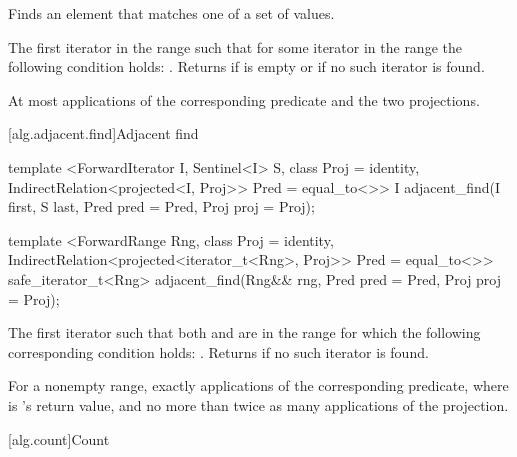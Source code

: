 \begin{itemdescr}
\pnum
\effects
Finds an element that matches one of a set of values.

\pnum
\returns
The first iterator
in the range 
such that for some
iterator
in the range 
the following condition holds:
.
Returns 
if  is empty or if
no such iterator is found.

\pnum
\complexity
At most
applications of the corresponding predicate and the two projections.
\end{itemdescr}

[alg.adjacent.find]{Adjacent find}

%
\begin{itemdecl}
template <ForwardIterator I, Sentinel<I> S, class Proj = identity,
    IndirectRelation<projected<I, Proj>> Pred = equal_to<>>
  I
    adjacent_find(I first, S last, Pred pred = Pred{},
                  Proj proj = Proj{});

template <ForwardRange Rng, class Proj = identity,
    IndirectRelation<projected<iterator_t<Rng>, Proj>> Pred = equal_to<>>
  safe_iterator_t<Rng>
    adjacent_find(Rng&& rng, Pred pred = Pred{}, Proj proj = Proj{});
\end{itemdecl}

\begin{itemdescr}
\pnum
\returns
The first iterator
such that both
and
are in
the range
for which
the following corresponding condition holds:
.
Returns 
if no such iterator is found.

\pnum
\complexity
For a nonempty range, exactly
applications of the corresponding predicate, where  is
's
return value, and no more than twice as many applications of the projection.
\end{itemdescr}

[alg.count]{Count}

